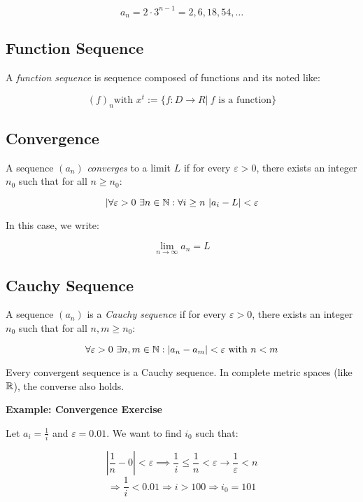 \[
    a_n = 2 \cdot 3^{n-1} = 2, 6, 18, 54, \dots
\]

\subsection{Function Sequence}

A \emph{function sequence} is sequence composed of functions and its noted like:

\[
    {(f)}_n \text{with } x^t := \{ f: D\to R | \ f \text{ is a function}\}
\]

\subsection{Convergence}

A sequence \((a_n)\) \emph{converges} to a limit \(L\) if for every \(\varepsilon > 0\), there exists an 
integer \(n_0\) such that for all \(n \ge n_0\):

\[
    |\forall \varepsilon > 0\ \exists n \in \mathbb{N}: \forall i \ge n\ |a_i - L| < \varepsilon
\]

In this case, we write:

\[
    \lim_{n \to \infty} a_n = L
\]

\subsection{Cauchy Sequence}

A sequence \((a_n)\) is a \emph{Cauchy sequence} if for every \(\varepsilon > 0\), there exists an 
integer \(n_0\) such that for all \(n, m \ge n_0\):

\[
    \forall \varepsilon > 0\ \exists n,m \in \mathbb{N}: |a_n - a_m| < \varepsilon\ \text{with } n < m
\]

Every convergent sequence is a Cauchy sequence. In complete metric spaces (like \(\mathbb{R}\)), the 
converse also holds.
\vspace{\baselineskip}

\textbf{Example: Convergence Exercise}
\vspace{\baselineskip}

Let \(a_i = \frac{1}{i}\) and \(\varepsilon = 0.01\). We want to find \(i_0\) such that:

\[
    \left|\frac{1}{n} - 0\right| < \varepsilon \implies \frac{1}{i} \le \frac{1}{n} < \varepsilon \rightarrow \frac{1}{\varepsilon} < n
\]
\[
    \Rightarrow \frac{1}{i} < 0.01 \Rightarrow i > 100
    \Rightarrow i_0 = 101
\]

